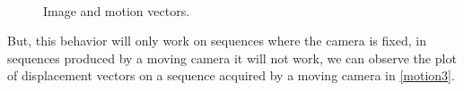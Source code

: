 \begin{figure}[H]
		
\centering

\\
\caption{Image and motion vectors.}
\label{motion2}
\end{figure}

But, this behavior will only work on sequences where the camera is fixed, in sequences produced by a moving camera it will not work, we can observe the plot of displacement vectors on a sequence acquired by a moving camera in \ref{motion3}. 

